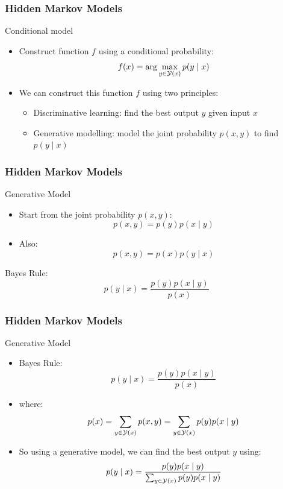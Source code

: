 \begin{frame}
\frametitle{Hidden Markov Models}
\begin{block}{Conditional model}
\begin{itemize}[<+->]
\item Construct function $f$ using a conditional probability:
\[ f(x) = \arg\max_{y \in {\cal Y}(x)} p(y \mid x) \]
\item We can construct this function $f$ using two principles:
\begin{itemize}
\item Discriminative learning: find the best output $y$ given input $x$
\item Generative modelling: model the joint probability $p(x,y)$ to find $p(y \mid x)$
\end{itemize}
\end{itemize}
\end{block}
\end{frame}

\begin{frame}
\frametitle{Hidden Markov Models}
\begin{block}{Generative Model}
\begin{itemize}[<+->]
\item Start from the joint probability $p(x,y)$:
\[ p(x,y) = p(y) p(x \mid y) \]
\item Also:
\[ p(x,y) = p(x) p(y \mid x) \]
\end{itemize}
\end{block}
\pause
\begin{block}{Bayes Rule:}
\[ p(y \mid x) = \frac{ p(y) p(x \mid y) }{ p(x) } \]
\end{block}
\end{frame}

\begin{frame}
\frametitle{Hidden Markov Models}
\begin{block}{Generative Model}
\begin{itemize}[<+->]
\item Bayes Rule:
\[ p(y \mid x) = \frac{ p(y) p(x \mid y) }{ p(x) } \]
\item where:
\[ p(x) = \sum_{y \in {\cal Y}(x)} p(x, y) = \sum_{y \in {\cal Y}(x)} p(y) p(x \mid y) \]
\item So using a generative model, we can find the best output $y$ using:
\[ p(y \mid x) = \frac{ p(y) p(x \mid y) }{ \sum_{y \in {\cal Y}(x)} p(y) p(x \mid y) } \]
\end{itemize}
\end{block}
\end{frame}

